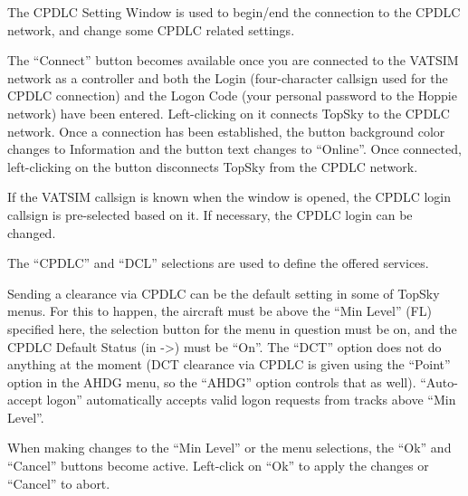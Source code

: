 \documentclass[a4paper,oneside,11pt]{memoir}
\begin{document}

The CPDLC Setting Window is used to begin/end the connection to the CPDLC network, and change some CPDLC related settings.

\bigskip

The “Connect” button becomes available once you are connected to the VATSIM network as a controller and both the Login (four-character callsign used for the CPDLC connection) and the Logon Code (your personal password to the Hoppie network) have been entered. Left-clicking on it connects TopSky to the CPDLC network. Once a connection has been established, the button background color changes to Information and the button text changes to “Online”. Once connected, left-clicking on the button disconnects TopSky from the CPDLC network.

\bigskip


\bigskip

If the VATSIM callsign is known when the window is opened, the CPDLC login callsign is pre-selected based on it. If necessary, the CPDLC login can be changed.

\bigskip

The “CPDLC” and “DCL” selections are used to define the offered services.

\bigskip

Sending a clearance via CPDLC can be the default setting in some of TopSky menus. For this to happen, the aircraft must be above the “Min Level” (FL) specified here, the selection button for the menu in question must be on, and the CPDLC Default Status (in ->) must be “On”. The “DCT” option does not do anything at the moment (DCT clearance via CPDLC is given using the “Point” option in the AHDG menu, so the “AHDG” option controls that as well). “Auto-accept logon” automatically accepts valid logon requests from tracks above “Min Level”.

\bigskip

When making changes to the “Min Level” or the menu selections, the “Ok” and “Cancel” buttons become active. Left-click on “Ok” to apply the changes or “Cancel” to abort.
\end{document}
